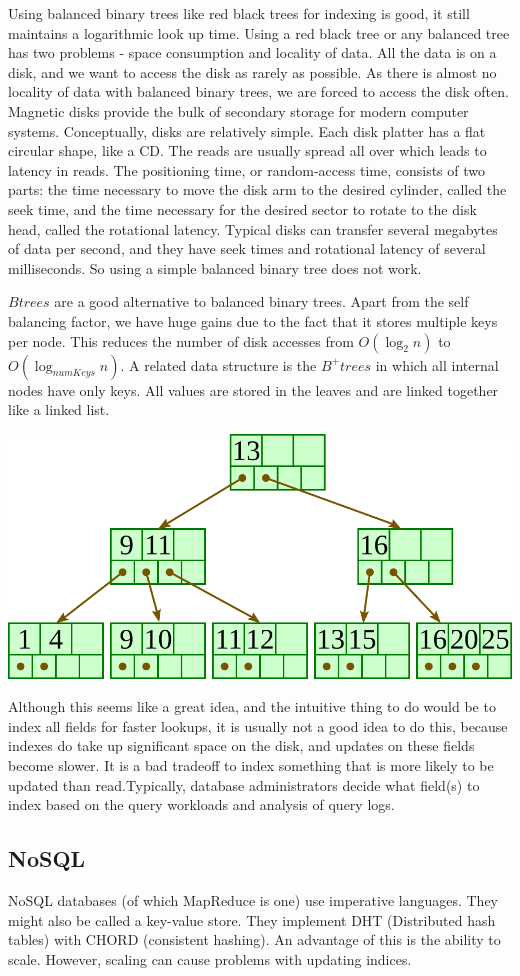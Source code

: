 \documentclass[twoside]{article}
\begin{document}
Using balanced binary trees like red black trees for indexing is good, it still maintains a logarithmic look up time. Using a red black tree or any balanced tree has two problems - space consumption and locality of data. All the data is on a disk, and we want to access the disk as rarely as possible. As there is almost no locality of data with balanced binary trees, we are forced to access the disk often. 
Magnetic disks provide the bulk of secondary storage for modern computer systems. Conceptually, disks are relatively simple. Each disk platter has a flat circular shape, like a CD. The reads are usually spread all over which leads to latency in reads. The positioning time, or random-access time, consists of two parts: the time necessary to move the disk arm to the desired cylinder, called the seek time, and the time necessary for the desired sector to rotate to the disk head, called the rotational latency. Typical disks can transfer several megabytes of data per second, and they have seek times and rotational latency of several milliseconds. So using a simple balanced binary tree does not work. 

$B trees$ are a good alternative to balanced binary trees. Apart from the self balancing factor, we have huge gains due to the fact that it stores multiple keys per node. This reduces the number of disk accesses from $O(\log_2n)$ to $O(\log_{numKeys}n)$. A related data structure is the $B^+ trees$ in which all internal nodes have only keys. All values are stored in the leaves and are linked together like a linked list. 

 \includegraphics[scale = 0.60]{btree-6.png}
 
Although this seems like a great idea, and the intuitive thing to do would be to index all fields for faster lookups, it is usually not a good idea to do this, because indexes do take up significant space on the disk, and updates on these fields become slower. It is a bad tradeoff to index something that is more likely to be updated than read.Typically, database administrators decide what field(s) to index based on the query workloads and analysis of query logs.

\subsection{NoSQL}
NoSQL databases (of which MapReduce is one) use imperative languages. They might also be called a key-value store. They implement DHT (Distributed hash tables) with CHORD (consistent hashing). An advantage of this is the ability to scale. However, scaling can cause problems with updating indices.
\end{document}
